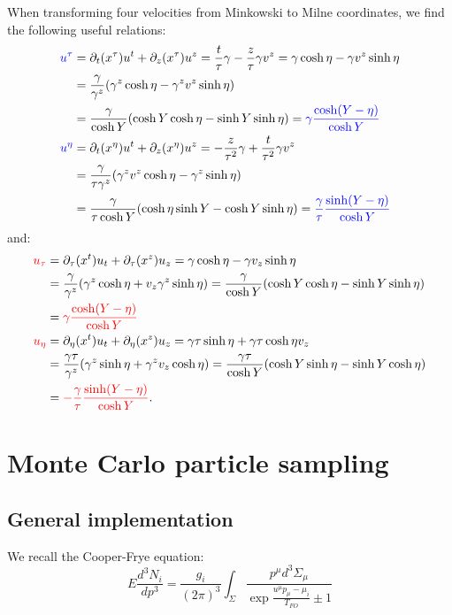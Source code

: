 \documentclass[12pt, a4paper]{report}
\begin{document}
When transforming four velocities from Minkowski to Milne coordinates, we find the following useful relations:
\begin{align}
{\color{blue}u^{\tau}}&=\partial_{t}(x^{\tau})u^t+\partial_{z}(x^{\tau})u^z=\frac{t}{\tau}\gamma-\frac{z}{\tau}\gamma v^z=\gamma \cosh \eta - \gamma v^z \sinh \eta\\
&=\dfrac{\gamma}{\gamma^z}(\gamma^z\cosh \eta - \gamma^z v^z \sinh \eta)\\
&=\dfrac{\gamma}{\cosh Y}(\cosh Y \cosh \eta - \sinh Y \sinh \eta)={\color{blue}\gamma \dfrac{\cosh(Y-\eta)}{\cosh Y}}\\
{\color{blue}u^{\eta}}&=\partial_{t}(x^{\eta})u^t+\partial_{z}(x^{\eta})u^z=-\frac{z}{\tau^2}\gamma+\frac{t}{\tau^2}\gamma v^z\\
&=\dfrac{\gamma}{\tau \gamma^z}(\gamma^z v^z \cosh \eta - \gamma^z \sinh \eta)\\
&=\dfrac{\gamma}{\tau \cosh Y}(\cosh \eta \sinh Y - \cosh Y \sinh \eta)={\color{blue}\dfrac{\gamma}{\tau} \dfrac{\sinh(Y-\eta)}{\cosh Y}}
\end{align}
and:
\begin{align}
{\color{red}u_{\tau}}&=\partial_{\tau}(x^t)u_t+\partial_{\tau}(x^z)u_z=\gamma \cosh \eta - \gamma v_z \sinh \eta\\
&=\dfrac{\gamma}{\gamma^z}(\gamma^z \cosh \eta + v_z \gamma^z \sinh \eta)=\dfrac{\gamma}{\cosh Y}(\cosh Y \cosh \eta - \sinh Y \sinh \eta)\\
&={\color{red}\gamma \dfrac{\cosh(Y-\eta)}{\cosh Y}}\\
{\color{red}u_{\eta}}&=\partial_{\eta}(x^t)u_t+\partial_{\eta}(x^z)u_z=\gamma\tau\sinh \eta + \gamma \tau \cosh \eta v_z\\
&=\dfrac{\gamma \tau}{\gamma^z}(\gamma^z \sinh \eta + \gamma^z v_z \cosh \eta)=
\dfrac{\gamma \tau}{\cosh Y}(\cosh Y \sinh \eta - \sinh Y \cosh \eta)\\
&={\color{red}-\dfrac{\gamma}{\tau} \dfrac{\sinh(Y-\eta)}{\cosh Y}}.
\end{align}


	
	\section{Monte Carlo particle sampling}
	\subsection{General implementation}
	We recall the Cooper-Frye equation:
	\begin{equation}
	E\dfrac{d^3 N_i}{dp^3}=\dfrac{g_i}{(2\pi)^3}\int_{\Sigma}\dfrac{p^{\mu} d^3\Sigma_{\mu}}{\exp{\frac{u^{\mu}p_{\mu}-\mu_i}{T_{FO}}\pm 1}}
	\end{equation}
	
\end{document}
